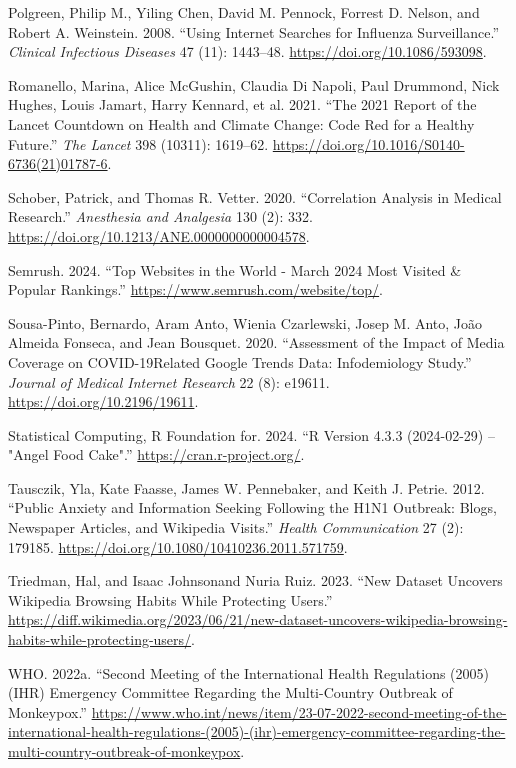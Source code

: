 \documentclass[
  12pt,
]{article}
\newlength{\cslhangindent}
\newenvironment{CSLReferences}[2] %
 {\begin{list}{}{%
  \setlength{\itemindent}{0pt}
  \setlength{\leftmargin}{0pt}
  \setlength{\parsep}{0pt}
  \ifodd #1
   \setlength{\leftmargin}{\cslhangindent}
   \setlength{\itemindent}{-1\cslhangindent}
  \fi
  \setlength{\itemsep}{#2\baselineskip}}}
 {\end{list}}
\begin{document}
\begin{CSLReferences}{1}{0}
Polgreen, Philip M., Yiling Chen, David M. Pennock, Forrest D. Nelson,
and Robert A. Weinstein. 2008. {``Using Internet Searches for Influenza
Surveillance.''} \emph{Clinical Infectious Diseases} 47 (11): 1443--48.
\url{https://doi.org/10.1086/593098}.

Romanello, Marina, Alice McGushin, Claudia Di Napoli, Paul Drummond,
Nick Hughes, Louis Jamart, Harry Kennard, et al. 2021. {``The 2021
Report of the Lancet Countdown on Health and Climate Change: Code Red
for a Healthy Future.''} \emph{The Lancet} 398 (10311): 1619--62.
\url{https://doi.org/10.1016/S0140-6736(21)01787-6}.

Schober, Patrick, and Thomas R. Vetter. 2020. {``Correlation Analysis in
Medical Research.''} \emph{Anesthesia and Analgesia} 130 (2): 332.
\url{https://doi.org/10.1213/ANE.0000000000004578}.

Semrush. 2024. {``Top Websites in the World - March 2024 Most Visited \&
Popular Rankings.''} \url{https://www.semrush.com/website/top/}.

Sousa-Pinto, Bernardo, Aram Anto, Wienia Czarlewski, Josep M. Anto, João
Almeida Fonseca, and Jean Bousquet. 2020. {``Assessment of the Impact of
Media Coverage on COVID-19{\textendash}Related Google Trends Data:
Infodemiology Study.''} \emph{Journal of Medical Internet Research} 22
(8): e19611. \url{https://doi.org/10.2196/19611}.

Statistical Computing, R Foundation for. 2024. {``R Version 4.3.3
(2024-02-29) -- "Angel Food Cake".''} \url{https://cran.r-project.org/}.

Tausczik, Yla, Kate Faasse, James W. Pennebaker, and Keith J. Petrie.
2012. {``Public Anxiety and Information Seeking Following the H1N1
Outbreak: Blogs, Newspaper Articles, and Wikipedia Visits.''}
\emph{Health Communication} 27 (2): 179185.
\url{https://doi.org/10.1080/10410236.2011.571759}.

Triedman, Hal, and Isaac Johnsonand Nuria Ruiz. 2023. {``New Dataset
Uncovers Wikipedia Browsing Habits While Protecting Users.''}
\url{https://diff.wikimedia.org/2023/06/21/new-dataset-uncovers-wikipedia-browsing-habits-while-protecting-users/}.

WHO. 2022a. {``Second Meeting of the International Health Regulations
(2005) (IHR) Emergency Committee Regarding the Multi-Country Outbreak of
Monkeypox.''}
\url{https://www.who.int/news/item/23-07-2022-second-meeting-of-the-international-health-regulations-(2005)-(ihr)-emergency-committee-regarding-the-multi-country-outbreak-of-monkeypox}.


\end{CSLReferences}
\end{document}
